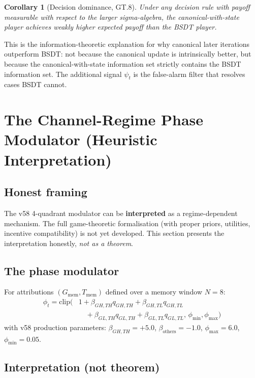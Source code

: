 \documentclass[11pt,a4paper]{article}
\newtheorem{corollary}[theorem]{Corollary}
\theoremstyle{definition}
\begin{document}
\begin{corollary}[Decision dominance, GT.8]
Under any decision rule with payoff measurable with respect to the larger sigma-algebra,
the canonical-with-state player achieves weakly higher expected payoff than the BSDT player.
\end{corollary}

This is the information-theoretic explanation for why canonical later iterations outperform BSDT:
not because the canonical update is intrinsically better, but because the canonical-with-state
information set strictly contains the BSDT information set. The additional signal $\psi_t$ is the
false-alarm filter that resolves cases BSDT cannot.

\section{The Channel-Regime Phase Modulator (Heuristic Interpretation)}

\subsection{Honest framing}

The v58 4-quadrant modulator can be \textbf{interpreted} as a regime-dependent mechanism.
The full game-theoretic formalisation (with proper priors, utilities, incentive compatibility) is not yet developed.
This section presents the interpretation honestly, \emph{not as a theorem}.

\subsection{The phase modulator}

For attributions $(G_\mathrm{mem}, T_\mathrm{mem})$ defined over a memory window $N=8$:
\begin{align*}
\phi_t = \mathrm{clip}(&1 + \beta_{GH,TH}q_{GH,TH} + \beta_{GH,TL}q_{GH,TL} \\
&\quad+ \beta_{GL,TH}q_{GL,TH} + \beta_{GL,TL}q_{GL,TL},\, \phi_\mathrm{min}, \phi_\mathrm{max})
\end{align*}
with v58 production parameters: $\beta_{GH,TH} = +5.0$, $\beta_\text{others} = -1.0$, $\phi_\mathrm{max} = 6.0$, $\phi_\mathrm{min} = 0.05$.

\subsection{Interpretation (not theorem)}
\end{document}
